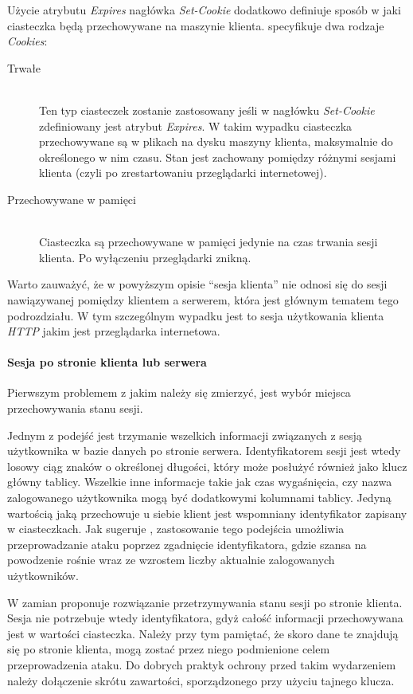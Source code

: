 \documentclass[11pt]{aghdpl}
\begin{document}
Użycie atrybutu \emph{Expires} nagłówka \emph{Set-Cookie} dodatkowo definiuje sposób w jaki ciasteczka będą przechowywane na maszynie klienta. \cite{MsC} specyfikuje dwa rodzaje \emph{Cookies}:

\begin{description}
\item[Trwałe] \hfill \\
Ten typ ciasteczek zostanie zastosowany jeśli w nagłówku \emph{Set-Cookie} zdefiniowany jest atrybut \emph{Expires}. W takim wypadku ciasteczka przechowywane są w plikach na dysku maszyny klienta, maksymalnie do określonego w nim czasu. Stan jest zachowany pomiędzy różnymi sesjami klienta (czyli po zrestartowaniu przeglądarki internetowej).
\item[Przechowywane w pamięci] \hfill \\
Ciasteczka są przechowywane w pamięci jedynie na czas trwania sesji klienta. Po wyłączeniu przeglądarki znikną.
\end{description}

Warto zauważyć, że w powyższym opisie ``sesja klienta'' nie odnosi się do sesji nawiązywanej pomiędzy klientem a serwerem, która jest głównym tematem tego podrozdziału. W tym szczególnym wypadku jest to sesja użytkowania klienta \emph{HTTP} jakim jest przeglądarka internetowa.

\paragraph{Sesja po stronie klienta lub serwera} Pierwszym problemem z jakim należy się zmierzyć, jest wybór miejsca przechowywania stanu sesji. 

Jednym z podejść jest trzymanie wszelkich informacji związanych z sesją użytkownika w bazie danych po stronie serwera. Identyfikatorem sesji jest wtedy losowy ciąg znaków o określonej długości, który może posłużyć również jako klucz główny tablicy. Wszelkie inne informacje takie jak czas wygaśnięcia, czy nazwa zalogowanego użytkownika mogą być dodatkowymi kolumnami tablicy. Jedyną wartością jaką przechowuje u siebie klient jest wspomniany identyfikator zapisany w ciasteczkach. Jak sugeruje \cite{ClAu}, zastosowanie tego podejścia umożliwia przeprowadzanie ataku poprzez zgadnięcie identyfikatora, gdzie szansa na powodzenie rośnie wraz ze wzrostem liczby aktualnie zalogowanych użytkowników.

W zamian \cite{ClAu} proponuje rozwiązanie przetrzymywania stanu sesji po stronie klienta. Sesja nie potrzebuje wtedy identyfikatora, gdyż całość informacji przechowywana jest w wartości ciasteczka. Należy przy tym pamiętać, że skoro dane te znajdują się po stronie klienta, mogą zostać przez niego podmienione celem przeprowadzenia ataku. Do dobrych praktyk ochrony przed takim wydarzeniem należy dołączenie skrótu zawartości, sporządzonego przy użyciu tajnego klucza.
\end{document}
